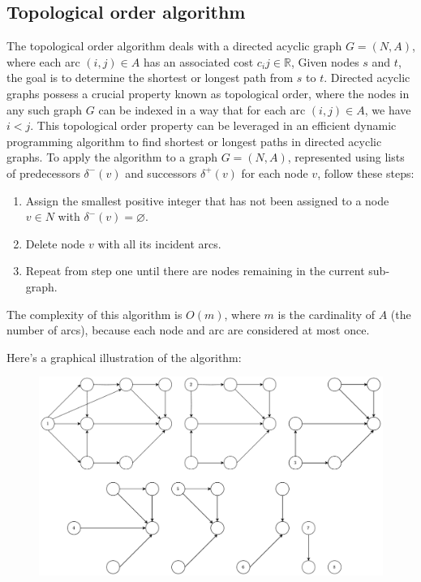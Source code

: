 \subsection*{Topological order algorithm}
The topological order algorithm deals with a directed acyclic graph $G = (N,A)$, where each arc $(i,j) \in A$ has an associated cost $c_ij \in \mathbb{R}$, 
Given nodes $s$ and $t$, the goal is to determine the shortest or longest path from $s$ to $t$.
Directed acyclic graphs possess a crucial property known as topological order, where the nodes in any such graph $G$ can be indexed in a way that for each arc $(i, j) \in A$, we have $i < j$. 
This topological order property can be leveraged in an efficient dynamic programming algorithm to find shortest or longest paths in directed acyclic graphs.
To apply the algorithm to a graph $G = (N,A)$, represented using lists of predecessors $\delta^{-}(v)$ and successors $\delta^{+}(v)$ for each node $v$, follow these steps:
\begin{enumerate}
    \item Assign the smallest positive integer that has not been assigned to a node $v \in N$ with $\delta^{-}(v)=\varnothing$. 
    \item Delete node $v$ with all its incident arcs.
    \item Repeat from step one until there are nodes remaining in the current sub-graph.
\end{enumerate}
The complexity of this algorithm is $O(m)$, where $m$ is the cardinality of $A$ (the number of arcs), because each node and arc are considered at most once.
\begin{example}
    Here's a graphical illustration of the algorithm:
    \begin{figure}[H]
        \centering
        \includegraphics[width=0.8\linewidth]{images/spath.png}
    \end{figure}
\end{example}


